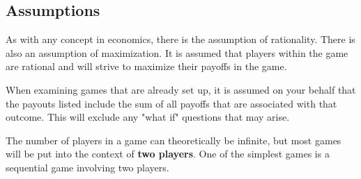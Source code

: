 \documentclass[11pt]{article} %
\begin{document}
\subsection{Assumptions}
As with any concept in economics, there is the assumption of rationality. There is also an assumption of maximization. It is assumed that players within the game are rational and will strive to maximize their payoffs in the game. 

\smallskip

When examining games that are already set up, it is assumed on your behalf that the payouts listed include the sum of all payoffs that are associated with that outcome. This will exclude any "what if" questions that may arise.

\smallskip

The number of players in a game can theoretically be infinite, but most games will be put into the context of \textbf{two players}. One of the simplest games is a sequential game involving two players.
\end{document}
